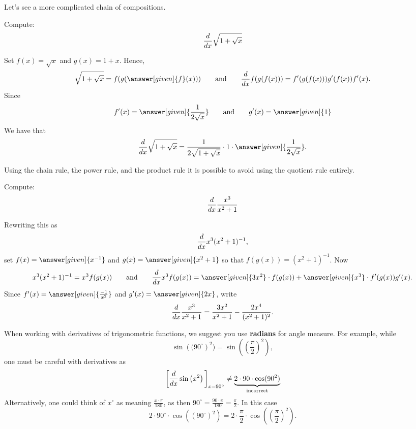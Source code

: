 \documentclass{ximera}
\begin{document}
Let's see a more complicated chain of compositions.

\begin{example}
Compute:
\[
\frac{d}{dx} \sqrt{1+\sqrt{x}}
\]

\begin{explanation}
Set 
$f(x)=\sqrt{x}$ and $g(x)=1+x$. Hence,
\[
\sqrt{1+\sqrt{x}}=f(g(\answer[given]{f}(x))) \qquad\text{and}\qquad\ddx f(g(f(x))) = f'(g(f(x)))g'(f(x))f'(x).
\]
Since 
\[
f'(x) = \answer[given]{\frac{1}{2\sqrt{x}}} \qquad\text{and}\qquad g'(x) = \answer[given]{1}
\]
We have that
\[
\ddx \sqrt{1+\sqrt{x}} = \frac{1}{2\sqrt{1+\sqrt{x}}}\cdot 1\cdot  \answer[given]{\frac{1}{2\sqrt{x}}}.
\]
\end{explanation}
\end{example}

Using the chain rule, the power rule, and the product rule it is
possible to avoid using the quotient rule entirely.

\begin{example}
Compute:
\[
\frac{d}{dx} \frac{x^3}{x^2+1}
\]

\begin{explanation}
Rewriting this as 
\[
\frac{d}{dx} x^3(x^2+1)^{-1}, 
\]
set $f(x) = \answer[given]{x^{-1}}$ and $g(x) = \answer[given]{x^2+1}$ so that $f(g(x)) = (x^2 + 1)^{-1}$. Now
\[
x^3(x^2+1)^{-1} = x^3 f(g(x)) \qquad\text{and}\qquad \ddx x^3 f(g(x)) = \answer[given]{3x^2} \cdot f(g(x))+ \answer[given]{x^3} \cdot f'(g(x))g'(x).
\]
Since $f'(x) = \answer[given]{\frac{-1}{x^2}}$ and $g'(x) = \answer[given]{2x}$, write
\[
\frac{d}{dx} \frac{x^3}{x^2+1} = \frac{3x^2}{x^2+1}-\frac{2x^4}{(x^2+1)^2}.
\]
\end{explanation}
\end{example}



\begin{warning}
When working with derivatives of trigonometric functions, we suggest
you use \textbf{radians} for angle measure. For example, while
\[
\sin\left((90^\circ\right)^2) = \sin\left(\left(\frac{\pi}{2}\right)^2\right),
\]
one must be careful with derivatives as
\[
\bigg[ \frac{d}{dx} \sin\left(x^2\right) \bigg]_{x=90^\circ} \ne \underbrace{2\cdot 90\cdot \cos(90^2)}_{\text{incorrect}}
\]
Alternatively, one could think of $x^\circ$ as meaning
$\frac{x\cdot\pi}{180}$, as then $90^\circ = \frac{90\cdot\pi}{180} =
\frac{\pi}{2}$. In this case
\[
2\cdot 90^\circ\cdot \cos((90^\circ)^2) = 2\cdot \frac{\pi}{2}\cdot\cos\left(\left(\frac{\pi}{2}\right)^2\right).
\]
\end{warning}
\end{document}
